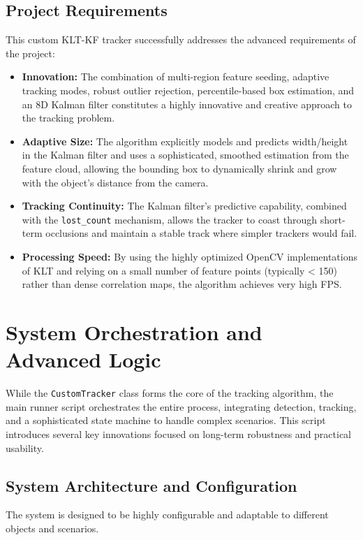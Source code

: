 \documentclass[12pt, a4paper]{article}
\begin{document}
\subsection{Project Requirements}
This custom KLT-KF tracker successfully addresses the advanced requirements of the project:
\begin{itemize}
    \item \textbf{Innovation:} The combination of multi-region feature seeding, adaptive tracking modes, robust outlier rejection, percentile-based box estimation, and an 8D Kalman filter constitutes a highly innovative and creative approach to the tracking problem.
    \item \textbf{Adaptive Size:} The algorithm explicitly models and predicts width/height in the Kalman filter and uses a sophisticated, smoothed estimation from the feature cloud, allowing the bounding box to dynamically shrink and grow with the object's distance from the camera.
    \item \textbf{Tracking Continuity:} The Kalman filter's predictive capability, combined with the \texttt{lost\_count} mechanism, allows the tracker to coast through short-term occlusions and maintain a stable track where simpler trackers would fail.
    \item \textbf{Processing Speed:} By using the highly optimized OpenCV implementations of KLT and relying on a small number of feature points (typically < 150) rather than dense correlation maps, the algorithm achieves very high FPS.
\end{itemize}

\section{System Orchestration and Advanced Logic}
While the \lstinline!CustomTracker! class forms the core of the tracking algorithm, the main runner script orchestrates the entire process, integrating detection, tracking, and a sophisticated state machine to handle complex scenarios. This script introduces several key innovations focused on long-term robustness and practical usability.

\subsection{System Architecture and Configuration}
The system is designed to be highly configurable and adaptable to different objects and scenarios.
\end{document}
